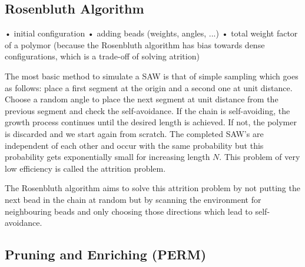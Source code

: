 \subsection*{Rosenbluth Algorithm}
		• initial configuration
		• adding beads (weights, angles, ...)
		• total weight factor of a polymor (because the Rosenbluth algorithm has bias towards dense configurations, which is a trade-off of solving atrition)

The most basic method to simulate a SAW is that of simple sampling which goes as follows: place a first segment at the origin and a second one at unit distance. Choose a random angle to place the next segment at unit distance from the previous segment and check the self-avoidance. If the chain is self-avoiding, the growth process continues until the desired length is achieved. If not, the polymer is discarded and we start again from scratch. The completed SAW's are independent of each other and occur with the same probability but this probability gets exponentially small for increasing length $N$. This problem of very low efficiency is called the attrition problem.

The Rosenbluth algorithm aims to solve this attrition problem by not putting the next bead in the chain at random but by scanning the environment for neighbouring beads and only choosing those directions which lead to self-avoidance.


\subsection*{Pruning and Enriching (PERM)}